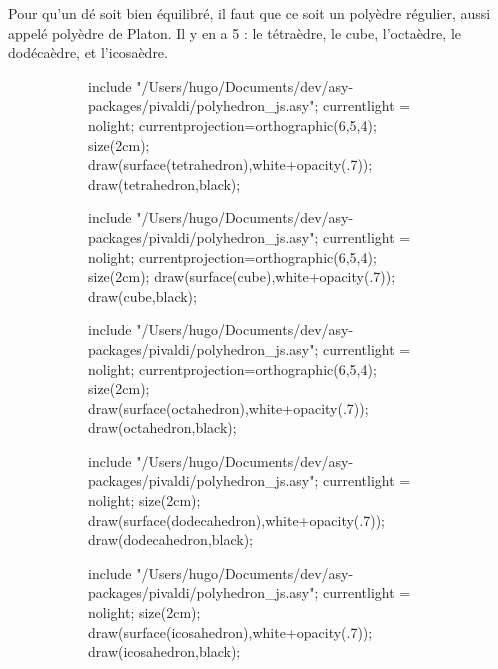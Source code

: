 \begin{exm}
	Pour qu'un dé soit bien équilibré, il faut que ce soit un polyèdre régulier, aussi appelé polyèdre de Platon. Il y en a 5 : le tétraèdre, le cube, l'octaèdre, le dodécaèdre, et l'icosaèdre.
	\begin{figure}[H]
		\centering
		\begin{subfigure}[b]{3cm}
			\centering
			\begin{asy}
				include "/Users/hugo/Documents/dev/asy-packages/pivaldi/polyhedron_js.asy";
				currentlight = nolight;
				currentprojection=orthographic(6,5,4);
				size(2cm);
				draw(surface(tetrahedron),white+opacity(.7));
				draw(tetrahedron,black);
			\end{asy}
		\end{subfigure}
		\begin{subfigure}[b]{3cm}
			\centering
			\begin{asy}
				include "/Users/hugo/Documents/dev/asy-packages/pivaldi/polyhedron_js.asy";
				currentlight = nolight;
				currentprojection=orthographic(6,5,4);
				size(2cm);
				draw(surface(cube),white+opacity(.7));
				draw(cube,black);
			\end{asy}
		\end{subfigure}
		\begin{subfigure}[b]{3cm}
			\centering
			\begin{asy}
				include "/Users/hugo/Documents/dev/asy-packages/pivaldi/polyhedron_js.asy";
				currentlight = nolight;
				currentprojection=orthographic(6,5,4);
				size(2cm);
				draw(surface(octahedron),white+opacity(.7));
				draw(octahedron,black);
			\end{asy}
		\end{subfigure}
		\begin{subfigure}[b]{3cm}
			\centering
			\begin{asy}
				include "/Users/hugo/Documents/dev/asy-packages/pivaldi/polyhedron_js.asy";
				currentlight = nolight;
				size(2cm);
				draw(surface(dodecahedron),white+opacity(.7));
				draw(dodecahedron,black);
			\end{asy}
		\end{subfigure}
		\begin{subfigure}[b]{3cm}
			\centering
			\begin{asy}
				include "/Users/hugo/Documents/dev/asy-packages/pivaldi/polyhedron_js.asy";
				currentlight = nolight;
				size(2cm);
				draw(surface(icosahedron),white+opacity(.7));
				draw(icosahedron,black);
			\end{asy}
		\end{subfigure}
	\end{figure}


\end{exm}
